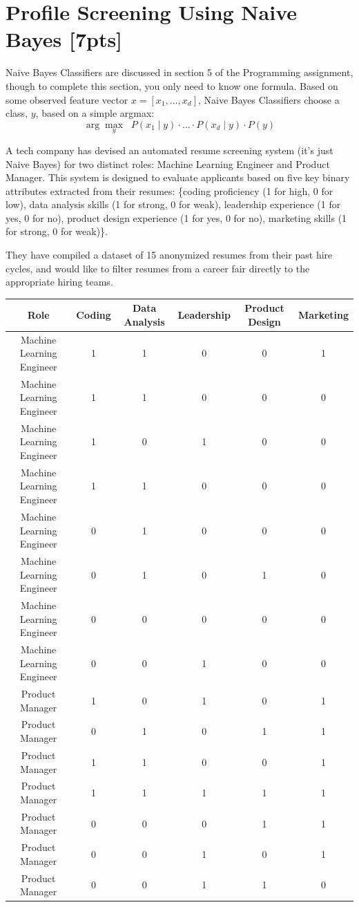 \section{Profile Screening Using Naive Bayes [7pts]}
Naive Bayes Classifiers are discussed in section 5 of the Programming assignment, though to complete this section, you only need to know one formula. Based on some observed feature vector $x = [x_{1}, \ldots, x_{d}]$, Naive Bayes Classifiers choose a class, $y$, based on a simple argmax:
$$
\arg \max_y\;\; P({x_{1}} \mid y) \cdot \ldots \cdot P({x_{d}} \mid y) \cdot P(y)
$$

A tech company has devised an automated resume screening system (it's just Naive Bayes) for two distinct roles: Machine Learning Engineer and Product Manager. This system is designed to evaluate applicants based on five key binary attributes extracted from their resumes: \{coding proficiency (1 for high, 0 for low), data analysis skills (1 for strong, 0 for weak), leadership experience (1 for yes, 0 for no), product design experience (1 for yes, 0 for no), marketing skills (1 for strong, 0 for weak)\}.

They have compiled a dataset of 15 anonymized resumes from their past hire cycles, and would like to filter resumes from a career fair directly to the appropriate hiring teams.

\bigskip
\begin{center}
\begin{tabular}{| c | c | c | c | c | c |}
    \hline
    Role & Coding & Data Analysis & Leadership & Product Design & Marketing \\\hline\hline
    Machine Learning Engineer & 1 & 1 & 0 & 0 & 1 \\\hline
    Machine Learning Engineer & 1 & 1 & 0 & 0 & 0 \\\hline
    Machine Learning Engineer & 1 & 0 & 1 & 0 & 0 \\\hline
    Machine Learning Engineer & 1 & 1 & 0 & 0 & 0 \\\hline
    Machine Learning Engineer & 0 & 1 & 0 & 0 & 0 \\\hline
    Machine Learning Engineer & 0 & 1 & 0 & 1 & 0 \\\hline
    Machine Learning Engineer & 0 & 0 & 0 & 0 & 0 \\\hline
    Machine Learning Engineer & 0 & 0 & 1 & 0 & 0 \\\hline
    Product Manager & 1 & 0 & 1 & 0 & 1 \\\hline
    Product Manager & 0 & 1 & 0 & 1 & 1 \\\hline
    Product Manager & 1 & 1 & 0 & 0 & 1 \\\hline
    Product Manager & 1 & 1 & 1 & 1 & 1 \\\hline
    Product Manager & 0 & 0 & 0 & 1 & 1 \\\hline
    Product Manager & 0 & 0 & 1 & 0 & 1 \\\hline
    Product Manager & 0 & 0 & 1 & 1 & 0 \\\hline
\end{tabular}
\end{center}
\bigskip

